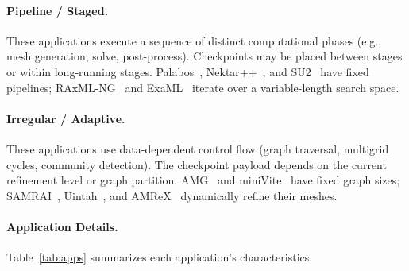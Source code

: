 \paragraph{Pipeline / Staged.}
These applications execute a sequence of distinct computational phases (e.g., mesh generation, solve, post-process). Checkpoints may be placed between stages or within long-running stages. Palabos~\cite{palabos}, Nektar++~\cite{nektar}, and SU2~\cite{su2} have fixed pipelines; RAxML-NG~\cite{raxml-ng} and ExaML~\cite{examl} iterate over a variable-length search space.

\paragraph{Irregular / Adaptive.}
These applications use data-dependent control flow (graph traversal, multigrid cycles, community detection). The checkpoint payload depends on the current refinement level or graph partition. AMG~\cite{amg} and miniVite~\cite{minivite} have fixed graph sizes; SAMRAI~\cite{samrai}, Uintah~\cite{uintah}, and AMReX~\cite{amrex} dynamically refine their meshes.

\paragraph{Application Details.}

Table~\ref{tab:apps} summarizes each application's characteristics.

